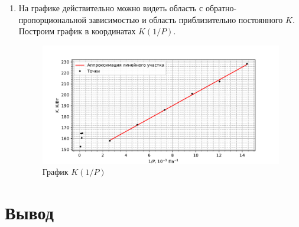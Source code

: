\documentclass[12pt]{article}
\begin{document}
\begin{enumerate}
            \item На графике действительно можно видеть область с обратно-пропорциональной зависимостью и
            область приблизительно постоянного $K$. Построим график в координатах $K(1/P)$.

            \begin{figure}[h]
                \centering
                \includegraphics[width=\textwidth]{graphs/KP_lin.pdf}
                \caption{График $K(1/P)$}
            \end{figure}

        \end{enumerate}
    \section{Вывод}

\newpage
%
\end{document}
